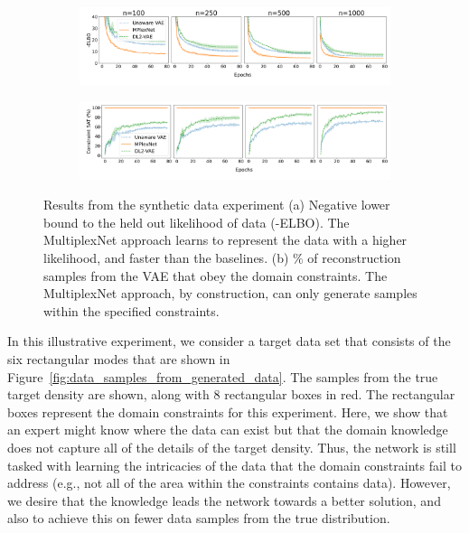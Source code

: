 \documentclass[letterpaper]{article} %
\begin{document}
\begin{figure}
     \centering
     \begin{subfigure}[b]{.8\textwidth}
         \centering
         \includegraphics[width=\textwidth]{images/synthetic_experiment_elbo.png}
         \caption{}
         \label{fig:synthetic_experiment_computational_results_subplot-a}
     \end{subfigure}
     
     \begin{subfigure}[b]{.8\textwidth}
         \centering
         \includegraphics[width=\textwidth]{images/synthetic_experiment_constraint_satisfaction.png}
         \caption{}
         \label{fig:synthetic_experiment_computational_results_subplot-b}
     \end{subfigure}

        \caption{Results from the synthetic data experiment (a) Negative lower bound to the held out likelihood of data (-ELBO). The MultiplexNet approach learns to represent the data with a higher likelihood, and faster than the baselines. (b) $\%$ of reconstruction samples from the VAE that obey the domain constraints. The MultiplexNet approach, by construction, can only generate samples within the specified constraints.}
        \label{fig:synthetic_experiment_computational_results}
\end{figure}

In this illustrative experiment, we consider a target data set that consists of the six rectangular modes that are shown in Figure~\ref{fig:data_samples_from_generated_data}.
The samples from the true target density are shown, along with $8$ rectangular boxes in red.
The rectangular boxes represent the domain constraints for this experiment.
Here, we show that an expert might know where the data can exist but that the domain knowledge does not capture all of the details of the target density.
Thus, the network is still tasked with learning the intricacies of the data that the domain constraints fail to address (e.g., not all of the area within the constraints contains data).
However, we desire that the knowledge leads the network towards a better solution, and also to achieve this on fewer data samples from the true distribution.
\end{document}
